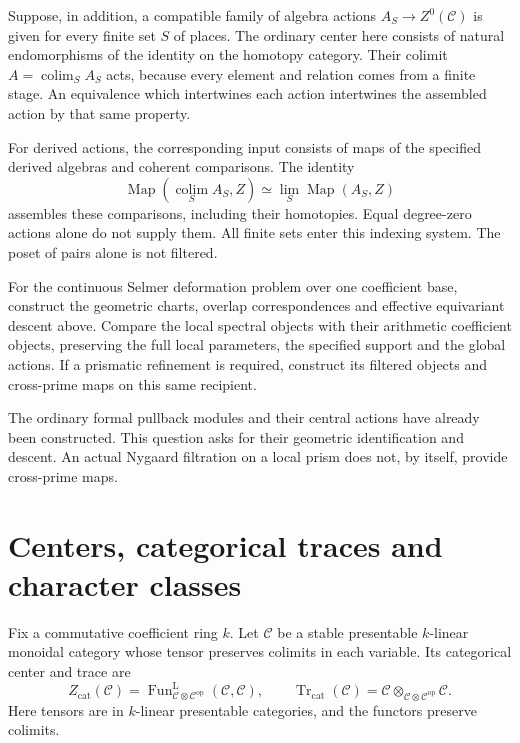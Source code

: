 Suppose, in addition, a compatible family of algebra actions
\(A_S\to Z^0(\mathcal C)\) is given for every finite set \(S\)
of places. The ordinary center here consists of natural
endomorphisms of the identity on the homotopy category.
Their colimit \(A=\operatorname*{colim}_S A_S\) acts, because
every element and relation comes from a finite stage.
An equivalence which intertwines each action intertwines the
assembled action by that same property.

For derived actions, the corresponding input consists of maps
of the specified derived algebras and coherent comparisons.
The identity
\[
 \operatorname{Map}(\operatorname*{colim}_S A_S,Z)
 \simeq\operatorname*{lim}_S\operatorname{Map}(A_S,Z)
\]
assembles these comparisons, including their homotopies.
Equal degree-zero actions alone do not supply them.
All finite sets enter this indexing system. The poset of pairs
alone is not filtered.

\begin{question}\label{v4-arith:ic:arithmetic-descent}
For the continuous Selmer deformation problem over one coefficient
base, construct the geometric charts, overlap correspondences and
effective equivariant descent above. Compare the local spectral
objects with their arithmetic coefficient objects, preserving the
full local parameters, the specified support and the global actions.
If a prismatic refinement is required, construct its filtered
objects and cross-prime maps on this same recipient.
\end{question}

The ordinary formal pullback modules and their central actions
have already been constructed. This question asks for their
geometric identification and descent. An actual Nygaard filtration
on a local prism does not, by itself, provide cross-prime maps.


\section{Centers, categorical traces and character classes}
\label{v4-arith:ic:traces}

Fix a commutative coefficient ring \(k\). Let \(\mathcal C\)
be a stable presentable \(k\)-linear monoidal category whose
tensor preserves colimits in each variable. Its categorical center
and trace are
\[
 Z_{\mathrm{cat}}(\mathcal C)
 =\operatorname{Fun}^{\mathrm L}_{\mathcal C\otimes\mathcal C^{\mathrm{op}}}
                     (\mathcal C,\mathcal C),
 \qquad
 \operatorname{Tr}_{\mathrm{cat}}(\mathcal C)
 =\mathcal C\otimes_{\mathcal C\otimes\mathcal C^{\mathrm{op}}}
                  \mathcal C.
\]
Here tensors are in \(k\)-linear presentable categories, and
the functors preserve colimits.

